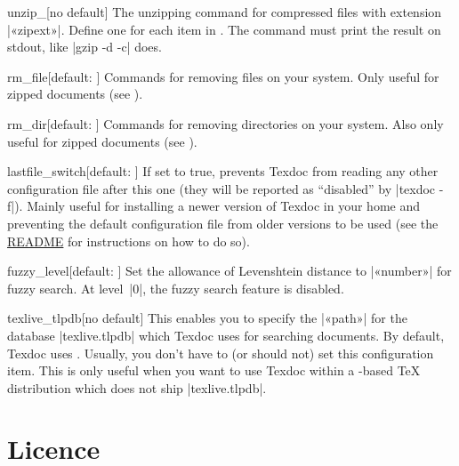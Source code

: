 \documentclass[draft]{texdoc-doc}
\begin{document}
\begin{confitem}{unzip\_}{}[no default]
The unzipping command for compressed files with extension |«zipext»|. Define
one for each item in . The command must print the result on
stdout, like |gzip -d -c| does.
\end{confitem}

\begin{confitem}{rm\_file}{}[default: ]
Commands for removing files on your system. Only useful for zipped documents
(see ).
\end{confitem}

\begin{confitem}{rm\_dir}{}[default: ]
Commands for removing directories on your system. Also only useful for zipped
documents (see ).
\end{confitem}

\begin{confitem}{lastfile\_switch}{}[default: ]
If set to true, prevents Texdoc from reading any other configuration file after
this one (they will be reported as ``disabled'' by |texdoc -f|). Mainly useful
for installing a newer version of Texdoc in your home and preventing the
default configuration file from older versions to be used (see the
\href{https://github.com/TeX-Live/texdoc}{README} for instructions on how to do
so).
\end{confitem}

\begin{confitem}{fuzzy\_level}{}[default: ]
Set the allowance of Levenshtein distance to |«number»| for fuzzy search. At
level~|0|, the fuzzy search feature is disabled.
\end{confitem}

\begin{confitem}{texlive\_tlpdb}{}[no default]
This enables you to specify the |«path»| for the database |texlive.tlpdb| which
Texdoc uses for searching documents. By default, Texdoc uses
. Usually, you don't have to (or should
not) set this configuration item. This is only useful when you want to use
Texdoc within a {\TL}-based {\TeX} distribution which does not ship
|texlive.tlpdb|.
\end{confitem}

\section{Licence}
\label{sec:licence}
\end{document}
